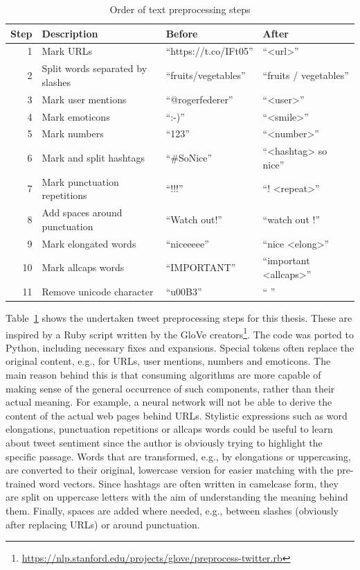 \begin{table}
\begin{tabular}{rlll}
\toprule
Step & Description & Before & After \\
\midrule
1 & Mark URLs & ``https://t.co/IFt05'' & ``<url>'' \\
2 & Split words separated by slashes & ``fruits/vegetables'' & ``fruits / vegetables'' \\
3 & Mark user mentions & ``@rogerfederer'' & ``<user>'' \\
4 & Mark emoticons & ``:-)'' & ``<smile>'' \\
5 & Mark numbers & ``123'' & ``<number>'' \\
6 & Mark and split hashtags & ``\#SoNice'' & ``<hashtag> so nice'' \\
7 & Mark punctuation repetitions & ``!!!'' & ``! <repeat>'' \\
8 & Add spaces around punctuation & ``Watch out!'' & ``watch out !'' \\
9 & Mark elongated words & ``niceeeee'' & ``nice <elong>'' \\
10 & Mark allcaps words & ``IMPORTANT'' & ``important <allcaps>'' \\
11 & Remove unicode character & ``u00B3'' & `` '' \\
\bottomrule
\end{tabular}
\caption{Order of text preprocessing steps}
\label{tab:text_preprocessing}
\end{table}

Table~\ref{tab:text_preprocessing} shows the undertaken tweet preprocessing
steps for this thesis.
These are inspired by a Ruby script written by the GloVe creators\footnote{\url{https://nlp.stanford.edu/projects/glove/preprocess-twitter.rb}}.
The code was ported to Python, including necessary fixes and expansions.
Special tokens often replace the original content, e.g., for URLs, user mentions,
numbers and emoticons.
The main reason behind this is that consuming algorithms are more capable of
making sense of the general occurrence of such components, rather than their
actual meaning.
For example, a neural network will not be able to derive the content of the
actual web pages behind URLs.
Stylistic expressions such as word elongations, punctuation repetitions or
allcaps words could be useful to learn about tweet sentiment since the author is 
obviously trying to highlight the specific passage.
Words that are transformed, e.g., by elongations or uppercasing, are converted to their original, lowercase
version for easier matching with the pre-trained word vectors.
Since hashtags are often written in camelcase form, they are split on uppercase
letters with the aim of understanding the meaning behind them.
Finally, spaces are added where needed, e.g., between slashes (obviously after
replacing URLs) or around punctuation.

